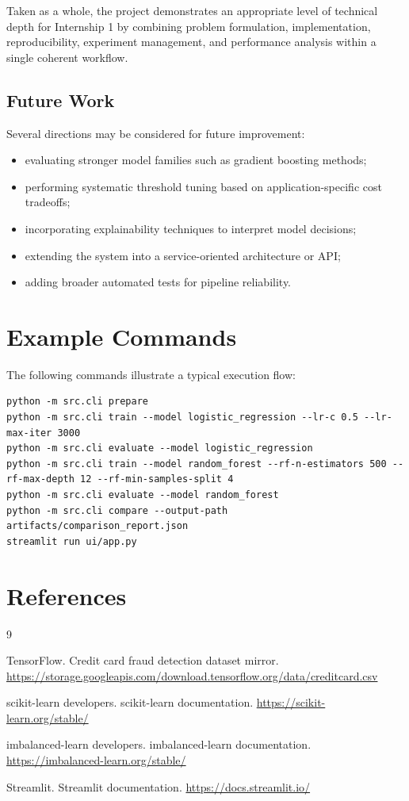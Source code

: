 \documentclass[12pt,a4paper]{report}
\begin{document}
Taken as a whole, the project demonstrates an appropriate level of technical depth for Internship 1 by combining problem formulation, implementation, reproducibility, experiment management, and performance analysis within a single coherent workflow.

\section{Future Work}
Several directions may be considered for future improvement:
\begin{itemize}
    \item evaluating stronger model families such as gradient boosting methods;
    \item performing systematic threshold tuning based on application-specific cost tradeoffs;
    \item incorporating explainability techniques to interpret model decisions;
    \item extending the system into a service-oriented architecture or API;
    \item adding broader automated tests for pipeline reliability.
\end{itemize}

\appendix
\chapter{Example Commands}
The following commands illustrate a typical execution flow:

\begin{verbatim}
python -m src.cli prepare
python -m src.cli train --model logistic_regression --lr-c 0.5 --lr-max-iter 3000
python -m src.cli evaluate --model logistic_regression
python -m src.cli train --model random_forest --rf-n-estimators 500 --rf-max-depth 12 --rf-min-samples-split 4
python -m src.cli evaluate --model random_forest
python -m src.cli compare --output-path artifacts/comparison_report.json
streamlit run ui/app.py
\end{verbatim}

\chapter{References}
\begin{thebibliography}{9}

TensorFlow.
\newblock Credit card fraud detection dataset mirror.
\newblock \url{https://storage.googleapis.com/download.tensorflow.org/data/creditcard.csv}

scikit-learn developers.
\newblock scikit-learn documentation.
\newblock \url{https://scikit-learn.org/stable/}

imbalanced-learn developers.
\newblock imbalanced-learn documentation.
\newblock \url{https://imbalanced-learn.org/stable/}

Streamlit.
\newblock Streamlit documentation.
\newblock \url{https://docs.streamlit.io/}

\end{thebibliography}
\end{document}
